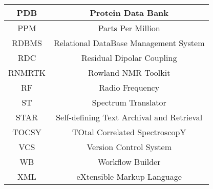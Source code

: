 \begin{center}
\begin{longtable}{ | c || c | }
    PDB     & Protein Data Bank                         \\  \hline 
    PPM     & Parts Per Million                         \\  \hline 
    RDBMS   & Relational DataBase Management System     \\  \hline 
    RDC     & Residual Dipolar Coupling                 \\  \hline 
    RNMRTK  & Rowland NMR Toolkit                       \\  \hline 
    RF      & Radio Frequency                           \\  \hline 
    ST      & Spectrum Translator                       \\  \hline 
    STAR    & Self-defining Text Archival and Retrieval \\  \hline 
    TOCSY   & TOtal Correlated SpectroscopY             \\  \hline 
    VCS     & Version Control System                    \\  \hline
    WB      & Workflow Builder                          \\  \hline 
    XML     & eXtensible Markup Language                \\  \hline 
    \end{longtable}
    \label{acronyms}
\end{center}

